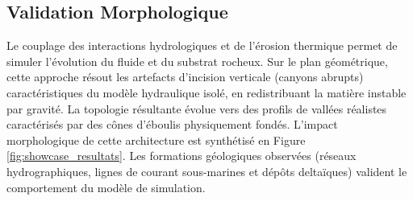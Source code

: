 \documentclass[10pt,twocolumn,a4paper]{article}
\begin{document}
\subsection{Validation Morphologique}\label{subsec:morphologie}
Le couplage des interactions hydrologiques et de l'érosion thermique permet de simuler l'évolution du fluide et du substrat rocheux. Sur le plan géométrique, cette approche résout les artefacts d'incision verticale (canyons abrupts) caractéristiques du modèle hydraulique isolé, en redistribuant la matière instable par gravité. La topologie résultante évolue vers des profils de vallées réalistes caractérisés par des cônes d'éboulis physiquement fondés. L'impact morphologique de cette architecture est synthétisé en Figure \ref{fig:showcase_resultats}. Les formations géologiques observées (réseaux hydrographiques, lignes de courant sous-marines et dépôts deltaïques) valident le comportement du modèle de simulation.
\end{document}
